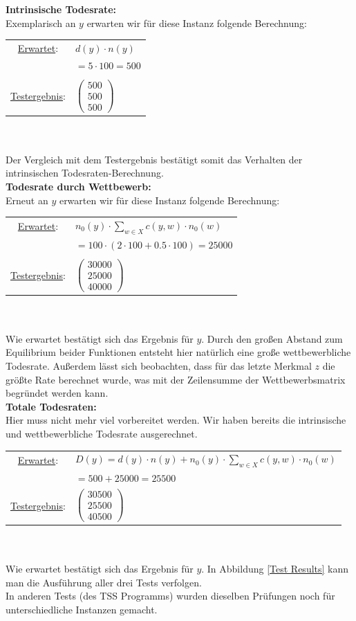 \documentclass[11pt, a4paper, german]{article}
\theoremstyle{plain}
\newcommand{\trvec}[3]{\begin{pmatrix}#1\\#2\\#3\end{pmatrix}}
\begin{document}
	\textbf{Intrinsische Todesrate:}\\
	Exemplarisch an $ y $ erwarten wir für diese Instanz folgende Berechnung:\\
	\renewcommand{\arraystretch}{1.2}
	\begin{tabular}{c l}
		\underline{Erwartet}: 		& $ d(y) \cdot n(y)  $\\
						& $ = 5 \cdot 100 = 500 $ \\\\
		\underline{Testergebnis}: 	& $ \trvec{500}{500}{500} $
	\end{tabular}\\\\
	Der Vergleich mit dem Testergebnis bestätigt somit das Verhalten der intrinsischen Todesraten-Berechnung.\\
	
	\textbf{Todesrate durch Wettbewerb:}\\
	Erneut an $ y $ erwarten wir für diese Instanz folgende Berechnung:\\
	
	\begin{tabular}{c l}
		\underline{Erwartet}: 		& $ n_0(y) \cdot \sum_{w \in X} c(y,w) \cdot n_0(w) $\\
						& $ = 100 \cdot ( 2 \cdot 100 + 0.5 \cdot 100 ) = 25000 $\\\\
		\underline{Testergebnis}: 	& $ \trvec{30000}{25000}{40000} $
	\end{tabular}\\\\
	Wie erwartet bestätigt sich das Ergebnis für $ y $. Durch den großen Abstand zum Equilibrium beider Funktionen entsteht hier natürlich eine große wettbewerbliche Todesrate. Außerdem lässt sich beobachten, dass für das letzte Merkmal $ z $ die größte Rate berechnet wurde, was mit der Zeilensumme der Wettbewerbsmatrix begründet werden kann.\\
	
	\textbf{Totale Todesraten:}\\
	Hier muss nicht mehr viel vorbereitet werden. Wir haben bereits die intrinsische und wettbewerbliche Todesrate ausgerechnet. \\
	
	\begin{tabular}{c l}
		\underline{Erwartet}: 		& $ D(y) =  d(y) \cdot n(y) + n_0(y) \cdot \sum_{w \in X} c(y,w) \cdot n_0(w) $\\
						& $ = 500 + 25000 = 25500$\\
		\underline{Testergebnis}: 	& $ \trvec{30500}{25500}{40500} $
	\end{tabular}\\\\
	Wie erwartet bestätigt sich das Ergebnis für $ y $. In Abbildung \ref{Test Results} kann man die Ausführung aller drei Tests verfolgen.\\
	In anderen Tests (des TSS Programms) wurden dieselben Prüfungen noch für unterschiedliche Instanzen gemacht.\\
	
\end{document}
